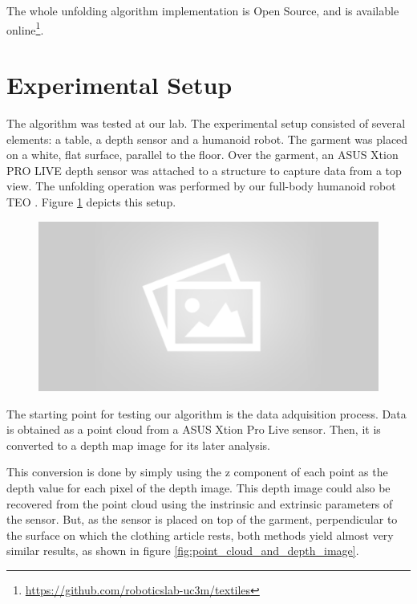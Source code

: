 The whole unfolding algorithm implementation is Open Source, and is available online\footnote{\url{https://github.com/roboticslab-uc3m/textiles}}.

\section{Experimental Setup}
\label{experiments:expermimental_setup}

The algorithm was tested at our lab. The experimental setup consisted of several elements: a table, a depth sensor and a humanoid robot. The garment was placed on a white, flat surface, parallel to the floor. Over the garment, an ASUS Xtion PRO LIVE depth sensor was attached to a structure to capture data from a top view. The unfolding operation was performed by our full-body humanoid robot TEO \cite{martinez2012teo}. Figure \ref{fig:experimental_setup} depicts this setup.

\comment{[...]}

\begin{figure}[thpb]
    \centering
    \includegraphics[width=0.7
    \textwidth]{figures/placeholder2.png}
    \caption{}
    \label{fig:experimental_setup}
\end{figure}

The starting point for testing our algorithm is the data adquisition process. Data is obtained as a point cloud from a ASUS Xtion Pro Live sensor. Then, it is converted to a depth map image for its later analysis. 

This conversion is done by simply using the z component of each point as the depth value for each pixel of the depth image. This depth image could also be recovered from the point cloud using the instrinsic and extrinsic parameters of the sensor. But, as the sensor is placed on top of the garment, perpendicular to the surface on which the clothing article rests, both methods yield almost very similar results, as shown in figure \ref{fig:point_cloud_and_depth_image}.

